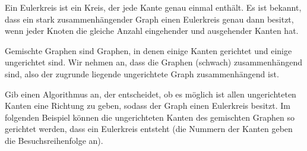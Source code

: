 \documentclass{uebung_cs}
\begin{document}
\begin{aufgabe}
    Ein Eulerkreis ist ein Kreis, der jede Kante genau einmal enthält.
    Es ist bekannt, dass ein stark zusammenhängender Graph einen Eulerkreis genau dann besitzt, wenn jeder Knoten die gleiche Anzahl eingehender und ausgehender Kanten hat.

	Gemischte Graphen sind Graphen, in denen einige Kanten gerichtet und einige ungerichtet sind. Wir nehmen an, dass die Graphen (schwach) zusammenhängend sind, also der zugrunde liegende ungerichtete Graph zusammenhängend ist. 
    
    Gib einen Algorithmus an, der entscheidet, ob es möglich ist allen ungerichteten Kanten eine Richtung zu geben, sodass der Graph einen Eulerkreis besitzt. Im folgenden Beispiel können die ungerichteten Kanten des gemischten Graphen so gerichtet werden, dass ein Eulerkreis entsteht (die Nummern der Kanten geben die Besuchsreihenfolge an).
    \newpage
    \begin{figure}[ht]
    	\begin{minipage}[b]{0.5\textwidth}
    		\centering
    	\end{minipage}
    	\begin{minipage}[b]{0.5\textwidth}
    		\centering
\end{minipage}
\end{figure}
\end{aufgabe}
\end{document}

